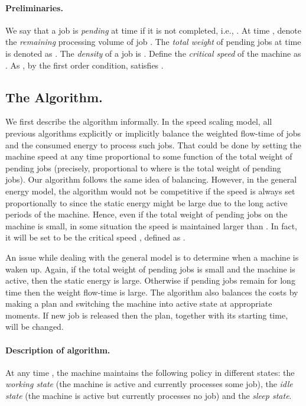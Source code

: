 \documentclass[11pt]{article}
\begin{document}
\paragraph{Preliminaries.}
We say that a job  is \emph{pending} at time  if it is not completed, i.e., . 
At time , denote  the \emph{remaining} processing volume of job .
The \emph{total weight} of pending jobs at time  
is denoted as . 
The \emph{density} of a job  is . 
Define the \emph{critical speed}  of the machine 
as . As , by 
the first order condition,  satisfies .


\subsection{The Algorithm.} 

We first describe the algorithm informally. In the speed scaling model, all previous algorithms 
explicitly or implicitly balance the weighted flow-time of jobs and the consumed energy to process such jobs. 
That could be done by setting the machine speed at any time  proportional to 
some function of the total weight of pending jobs (precisely, proportional to 
 where  is the total weight of pending jobs).
Our algorithm follows the same idea of balancing.
However, in the general energy model, the algorithm would not be competitive if 
the speed is always set proportionally to  since the static energy might be large
due to the long active periods of the machine. Hence, even if the total weight of 
pending jobs on the machine is small, in some situation the speed is maintained larger than 
. In fact, it will be set to be the critical 
speed , defined as . 


An issue while dealing with the general model is to determine when a machine is waken up.
Again, if the total weight of pending jobs is small and the machine is active,
then the static energy is large. Otherwise if pending jobs remain for long time then the 
weight flow-time is large. The algorithm also balances the costs by making a plan and 
switching the machine into active state at appropriate moments. 
If new job is released then the plan, together with its starting time, will be changed.  

\paragraph{Description of algorithm.}
At any time , the machine maintains the following policy
in different states: the \emph{working state} (the machine is active and currently processes
some job), the \emph{idle state} (the machine is active but currently processes no job) and 
the \emph{sleep state}.
\end{document}

